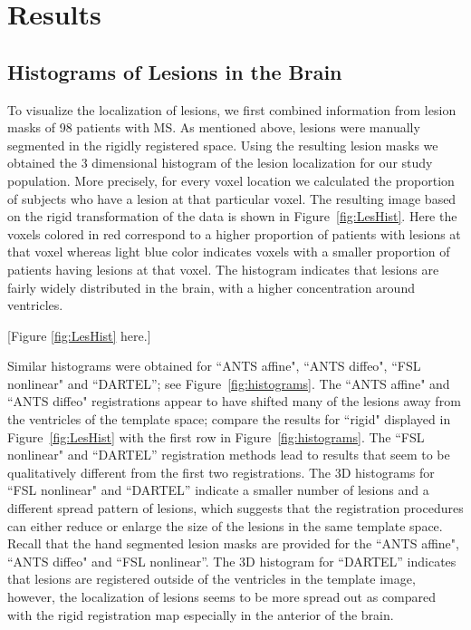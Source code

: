 \documentclass[10pt]{article}
\begin{document}
\section*{Results}


\subsection*{Histograms of Lesions in the Brain}

To visualize the localization of lesions, we first combined
information from lesion masks of 98 patients with MS. As mentioned above, lesions were manually segmented in the rigidly registered space. Using the resulting lesion masks we
obtained the 3 dimensional histogram of the lesion localization for
our study population. More precisely, for every voxel location we
calculated the proportion of subjects who have a lesion at that
particular voxel. The resulting image based on the rigid
transformation of the data is shown in Figure~\ref{fig:LesHist}.
Here the voxels colored in red correspond to a higher proportion of
patients with lesions at that voxel whereas light blue color
indicates voxels with a smaller proportion of patients having
lesions at that voxel. The histogram indicates that lesions are
fairly widely distributed in the brain, with a higher concentration
around ventricles.

[Figure \ref{fig:LesHist} here.]


Similar histograms were obtained for ``ANTS affine", ``ANTS diffeo", ``FSL nonlinear" and ``DARTEL''; see Figure~\ref{fig:histograms}. The ``ANTS affine" and ``ANTS diffeo" registrations appear to have shifted many of the lesions away from the ventricles of the template space; compare the results for ``rigid" displayed in
Figure~\ref{fig:LesHist} with the first row in Figure~\ref{fig:histograms}. The ``FSL nonlinear" and ``DARTEL'' registration methods lead to results that seem to be qualitatively different from the first two registrations. The 3D histograms for ``FSL nonlinear" and ``DARTEL'' indicate a smaller number of lesions and a different spread pattern of lesions, which suggests that the registration procedures can either reduce or enlarge the size of the lesions in the same template space. Recall that the hand segmented lesion masks are provided for the ``ANTS affine", ``ANTS diffeo" and ``FSL nonlinear''. The 3D histogram for ``DARTEL'' indicates that lesions are registered outside of the ventricles in the template image, however, the localization of lesions seems to be more spread out as compared with the rigid registration map especially in the anterior of the brain. 
\end{document}
